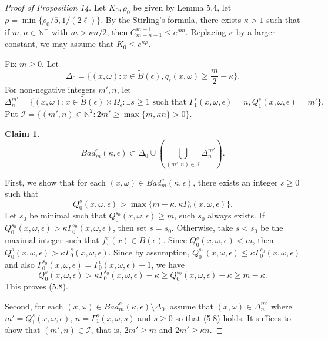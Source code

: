 \documentclass[11pt,oneside]{article}
\newtheorem*{claim}{Claim}
\theoremstyle{plain}
\numberwithin{equation}{section}
\numberwithin{figure}{section}
\numberwithin{table}{section}
\begin{document}
\begin{proof}[Proof of Proposition 14]


Let $K_0, \rho_0$ be given by Lemma 5.4, let $\rho= \min\{ \rho_0/5, 1/(2\ell) \}$. By the Stirling's formula, there exists $\kappa > 1$ such that if $m, n \in \mathbb N^+$ with $m > \kappa n/2$, then $C_{m+n-1}^{m-1} \leq e^{\rho m}$. Replacing $\kappa$ by a larger constant, we may assume that $K_0 \leq e^{\kappa \rho}$.


Fix $m \geq 0$. Let 
\[
\Delta_0 = \{(x, \omega) : x \in \tilde B(\epsilon), q_{\epsilon}(x, \omega) \geq \frac{m}{2} - \kappa \}.
\]
For non-negative integers $m', n$, let
\[
\Delta_n^{m'} = \{ (x, \omega) : x \in \tilde B(\epsilon) \times \Omega_{\epsilon}: \exists s \geq 1 \mbox{ such that }  \Gamma_1^s(x, \omega, \epsilon) =n, Q_1^s(x, \omega, \epsilon) = m' \}.
\]
Put $\mathcal I = \{ (m', n) \in \mathbb N^2 : 2 m' \geq \max\{ m, \kappa n \}>0 \}$.

\begin{claim}
\begin{equation}
Bad_m^c(\kappa, \epsilon) \subset \Delta_0 \cup \left( \bigcup_{(m', n) \in \mathcal I}\Delta_n^{m'}  \right).
\end{equation}
\end{claim}

First, we show that for each $(x, \omega) \in Bad_m^c(\kappa, \epsilon) $, there exists an integer $s \geq 0$ such that
\begin{equation}
Q_0^s(x, \omega, \epsilon)  > \max\{m - \kappa, \kappa \Gamma_0^s(x, \omega, \epsilon)  \}.
\end{equation}
Let $s_0$ be minimal such that $Q_0^{s_0}(x, \omega, \epsilon) \geq m$, such $s_0$ always exists. If $Q_0^{s_0}(x, \omega, \epsilon) > \kappa \Gamma_0^{s_0}(x, \omega, \epsilon)$, then set $s = s_0$. Otherwise, take $s < s_0$ be the maximal integer such that $f_{\omega}^s(x) \in \tilde B(\epsilon)$. Since $Q_0^s(x, \omega, \epsilon) < m$, then $Q_0^s(x, \omega, \epsilon) > \kappa \Gamma_0^s(x, \omega, \epsilon)$. Since by assumption, $Q_0^{s_0}(x, \omega, \epsilon) \leq \kappa \Gamma_0^{s_0}(x, \omega, \epsilon)$ and also $ \Gamma_0^{s_0}(x, \omega, \epsilon) =  \Gamma_0^{s}(x, \omega, \epsilon) + 1$, we have
\[
Q_0^s(x, \omega, \epsilon)  > \kappa \Gamma_0^{s_0}(x, \omega, \epsilon) - \kappa \geq Q_0^{s_0}(x, \omega, \epsilon) - \kappa \geq m - \kappa.
\]
This proves (5.8).


Second, for each $(x, \omega) \in Bad_m^c(\kappa, \epsilon) \setminus \Delta_0$, assume that $(x, \omega) \in \Delta_n^{m'}$ where $m' = Q_1^s(x, \omega, \epsilon)$, $n = \Gamma_1^s(x, \omega, s)$ and $s \geq 0$ so that (5.8) holds. It suffices to show that $(m', n) \in \mathcal I$, that is, $2m' \geq m $ and $2m' \geq \kappa n$. 



\end{proof}
\end{document}
